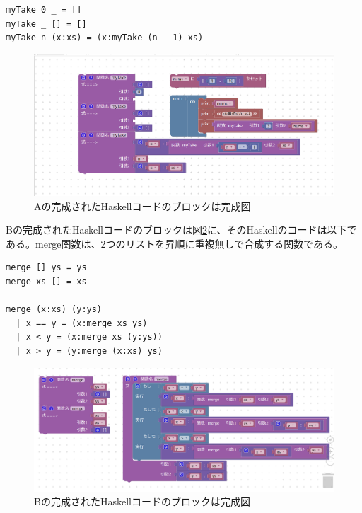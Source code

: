 \documentclass{risepaper}
\begin{document}
\begin{itemize}
\begin{lstlisting}[basicstyle=\ttfamily\footnotesize]
myTake 0 _ = []
myTake _ [] = []
myTake n (x:xs) = (x:myTake (n - 1) xs)
\end{lstlisting}

\begin{figure}[h]
\begin{center}
\includegraphics[scale=0.5]{img/haskell_experiment_result_a.PNG}
\caption{Aの完成されたHaskellコードのブロックは完成図}%
\label{fig:haskell_experiment_result_a}
\end{center}%
\end{figure}%

Bの完成されたHaskellコードのブロックは図\ref{fig:haskell_experiment_result_b}に、そのHaskellのコードは以下である。merge関数は、2つのリストを昇順に重複無しで合成する関数である。
\begin{lstlisting}[basicstyle=\ttfamily\footnotesize]
merge [] ys = ys
merge xs [] = xs

merge (x:xs) (y:ys)
  | x == y = (x:merge xs ys)
  | x < y = (x:merge xs (y:ys))
  | x > y = (y:merge (x:xs) ys)
\end{lstlisting}

\begin{figure}[h]
\begin{center}
\includegraphics[scale=0.5]{img/haskell_experiment_result_b.PNG}
\caption{Bの完成されたHaskellコードのブロックは完成図}%
\label{fig:haskell_experiment_result_b}
\end{center}%
\end{figure}%

\end{itemize} 
\end{document}
